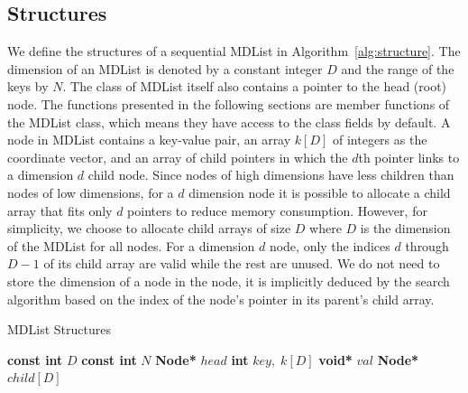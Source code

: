 \documentclass[10pt,journal,letter,compsoc]{IEEEtran}
\begin{document}
\vspace{-0.1in}
\subsection{Structures}
We define the structures of a sequential MDList in Algorithm~\ref{alg:structure}. 
The dimension of an MDList is denoted by a constant integer $D$ and the range of the keys by $N$.
The class of MDList itself also contains a pointer to the head (root) node.
The functions presented in the following sections are member functions of the MDList class, which means they have access to the class fields by default.
A node in MDList contains a key-value pair, an array $k[D]$ of integers as the coordinate vector, and an array of child pointers in which the $d$th pointer links to a dimension $d$ child node.
Since nodes of high dimensions have less children than nodes of low dimensions, for a $d$ dimension node it is possible to allocate a child array that fits only $d$ pointers to reduce memory consumption. 
However, for simplicity, we choose to allocate child arrays of size $D$ where $D$ is the dimension of the MDList for all nodes. 
For a dimension $d$ node, only the indices $d$ through $D-1$ of its child array are valid while the rest are unused.
We do not need to store the dimension of a node in the node, it is implicitly deduced by the search algorithm based on the index of the node's pointer in its parent's child array.

\begin{algorithm}[t]
    \caption{MDList Structures}
    \label{alg:structure}
    \vspace{-0.2in}
    \begin{multicols}{2}
        \begin{algorithmic}[1]
            \State \textbf{const int} $D$
            \State \textbf{const int} $N$
            \State \textbf{Node*} $head$
            \EndClass
            \State \textbf{int} $key,\;k[D]$
            \State \textbf{void*} $val$
            \State \textbf{Node*} $child[D]$
            \EndStruct
        \end{algorithmic}
    \end{multicols}
    \vspace{-0.15in}
\end{algorithm}

\end{document}

